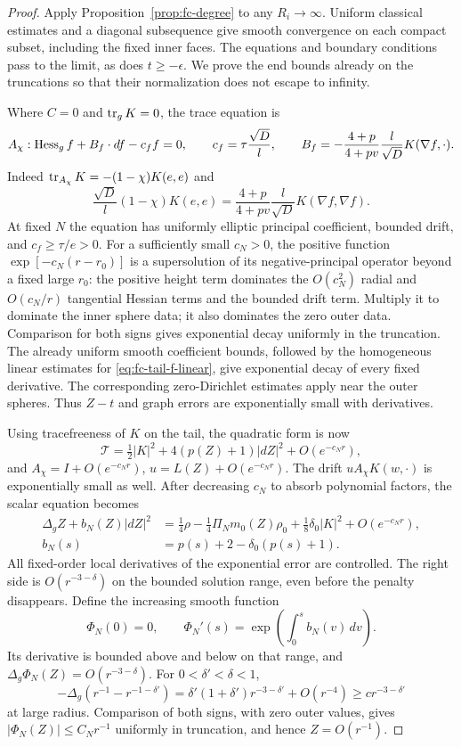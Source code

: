 \begin{proof}
Apply Proposition~\ref{prop:fc-degree} to any $R_i\to\infty$.
Uniform classical estimates and a diagonal subsequence give
smooth convergence on each compact subset, including the fixed
inner faces.  The equations and boundary conditions pass to the
limit, as does $t\ge-\epsilon$.  We prove the end bounds already
on the truncations so that their normalization does not escape
to infinity.

Where $C=0$ and $\operatorname{tr}_gK=0$, the trace equation is
\begin{equation}\label{eq:fc-tail-f-linear}
 A_\chi:\operatorname{Hess}_g f+B_f\cdot df-c_f f=0,
 \qquad c_f=\tau\frac{\sqrt D}{l},\qquad
 B_f=-\frac{4+p}{4+pv}\frac l{\sqrt D}K(\nabla f,\cdot).
\end{equation}
Indeed
$\operatorname{tr}_{A_\chi}K=-(1-\chi)K(e,e)$ and
\[
 \frac{\sqrt D}{l}(1-\chi)K(e,e)
        =\frac{4+p}{4+pv}\frac l{\sqrt D}K(\nabla f,\nabla f).
\]
At fixed $N$ the equation has uniformly elliptic principal
coefficient, bounded drift, and $c_f\ge\tau/e>0$.
For a sufficiently small $c_N>0$, the positive function
$\exp[-c_N(r-r_0)]$ is a supersolution of its negative-principal
operator beyond a fixed large $r_0$: the positive height term
dominates the $O(c_N^2)$ radial and $O(c_N/r)$ tangential Hessian
terms and the bounded drift term.  Multiply it to dominate the
inner sphere data; it also dominates the zero outer data.
Comparison for both signs gives exponential decay uniformly in
the truncation.  The already uniform smooth coefficient bounds,
followed by the homogeneous linear estimates for
\eqref{eq:fc-tail-f-linear}, give exponential decay of every
fixed derivative.  The corresponding zero-Dirichlet estimates
apply near the outer spheres.  Thus $Z-t$ and graph errors are
exponentially small with derivatives.

Using tracefreeness of $K$ on the tail, the quadratic form is now
\[
 \mathcal T=\tfrac12|K|^2+4(p(Z)+1)|dZ|^2+O(e^{-c_Nr}),
\]
and $A_\chi=I+O(e^{-c_Nr})$, $u=L(Z)+O(e^{-c_Nr})$.
The drift $uA_\chi K(w,\cdot)$ is exponentially small as well.
After decreasing $c_N$ to absorb polynomial factors, the scalar
equation becomes
\begin{equation}\label{eq:fc-tail-Z-equation}
\begin{aligned}
 \Delta_g Z+b_N(Z)|dZ|^2
 &=\tfrac14\rho-\tfrac14\Pi_N m_0(Z)\rho_0
                      +\tfrac18\delta_0|K|^2+O(e^{-c_Nr}),\\
 b_N(s)&=p(s)+2-\delta_0(p(s)+1).
\end{aligned}
\end{equation}
All fixed-order local derivatives of the exponential error are
controlled.  The right side is $O(r^{-3-\delta})$ on the bounded
solution range, even before the penalty disappears.
Define the increasing smooth function
\[
 \Phi_N(0)=0,\qquad
 \Phi_N'(s)=\exp\!\left(\int_0^s b_N(v)\,dv\right).
\]
Its derivative is bounded above and below on that range, and
$\Delta_g\Phi_N(Z)=O(r^{-3-\delta})$.
For $0<\delta'<\delta<1$,
\[
 -\Delta_g(r^{-1}-r^{-1-\delta'})
    =\delta'(1+\delta')r^{-3-\delta'}+O(r^{-4})
       \ge c r^{-3-\delta'}
\]
at large radius.  Comparison of both signs, with zero outer
values, gives $|\Phi_N(Z)|\le C_Nr^{-1}$ uniformly in truncation,
and hence $Z=O(r^{-1})$.


\end{proof}
